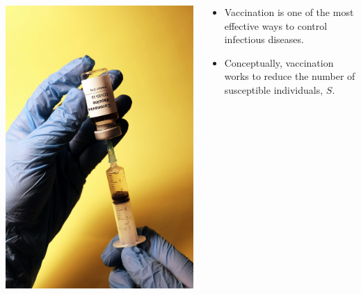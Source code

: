 \documentclass[
  ignorenonframetext,
]{beamer}
\providecommand{\tightlist}{%
  \setlength{\itemsep}{0pt}\setlength{\parskip}{0pt}}\usepackage{longtable,booktabs,array}
\begin{document}
\begin{frame}
\begin{columns}[T]
\begin{column}{0.4\textwidth}
\includegraphics[width=1\textwidth,height=\textheight]{images/vaccine.jpeg}
\end{column}

\begin{column}{0.6\textwidth}
\begin{itemize}
\tightlist
\item
  Vaccination is one of the most effective ways to control infectious
  diseases.
\item
  Conceptually, vaccination works to reduce the number of susceptible
  individuals, \(S\).
\end{itemize}
\end{column}
\end{columns}
\end{frame}
\end{document}
